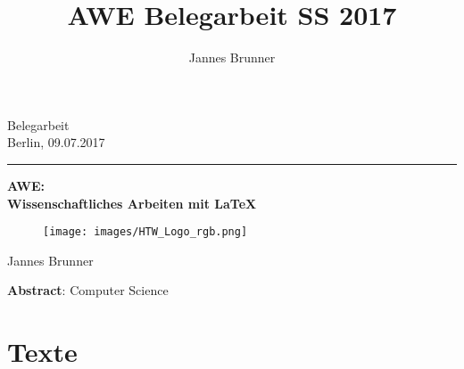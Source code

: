 \documentclass{scrreprt}
\begin{document}
\author{Jannes Brunner}
\title{AWE Belegarbeit SS 2017}

	\begin{titlepage}
		\begin{center}
			{\large Belegarbeit}\\
			{\large Berlin, 09.07.2017}
			\vspace{0.5cm} \hrule \vspace{0.6cm}
			{\huge \textbf{ AWE: \\ Wissenschaftliches Arbeiten mit LaTeX \\ }}
			\vspace{0.8cm}
			\begin{figure}[h!]
				\centering
				\texttt{[image: images/HTW\_Logo\_rgb.png]}
			\end{figure}
		
			\vspace{0.8cm}
			\large {Jannes Brunner}
		\end{center}
		\vspace{0.6cm}
		\textbf{Abstract}: Computer Science
	
		
	\end{titlepage}
	
	\tableofcontents
	
	\chapter{Texte}
\end{document}
